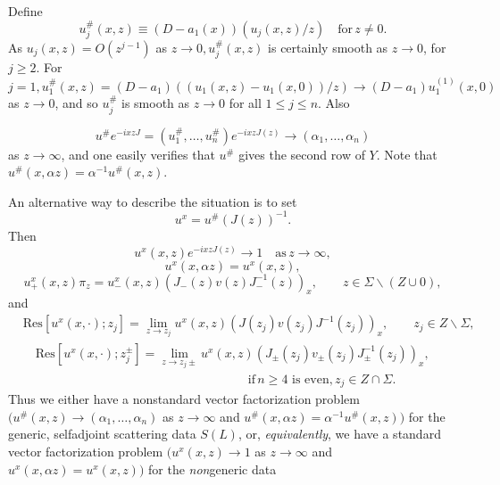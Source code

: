 \documentclass{surv-l}
\theoremstyle{plain}
\theoremstyle{definition}
\numberwithin{equation}{chapter}
\begin{document}
Define
\begin{equation}\label{eq38.12}
u_{j}^{\#}(x, z)\equiv(D-a_{1}(x))(u_{j}(x,z)/z) \quad \mathrm{for}\, z\neq 0.
\end{equation}
As $u_{j}(x, z)=O(z^{j-1})$ as $z\rightarrow 0, u_{j}^{\#}(x,z)$ is certainly smooth as $z\rightarrow 0$, for $j\geq 2$. For $j=1, u_{1}^{\#}(x, z)=(D-a_{1})((u_{1}(x, z)-u_{1}(x,0))/z)\rightarrow(D-a_{1})u_{1}^{(1)}(x, 0)$ as $z\rightarrow 0$, and so $u_{j}^{\#}$ is smooth as $z\rightarrow 0$ for all $1\leq j\leq n$. Also

\begin{equation*}
u^{\#}e^{-ixzJ}= (u_{1}^{\#},\ldots,u_{n}^{\#})e^{-ixzJ(z)}\rightarrow(\alpha_{1},\ldots,\alpha_{n})
\end{equation*}
as $ z\rightarrow\infty$, and one easily verifies that $ u^{\#}$ gives the second row of $Y$. Note that $u^{\#}(x,\alpha z)=\alpha^{-1} u^{\#}(x, z)$.

An alternative way to describe the situation is to set
\begin{equation}\label{eq38.13}
u^{x}=u^{\#}(J(z))^{-1}.
\end{equation}
Then
\begin{equation}\label{eq38.14}
u^{x}(x, z)e^{-ixzJ(z)}\rightarrow 1 \quad  \mathrm{as}\,z\rightarrow\infty,
\end{equation}
\begin{equation}\label{eq38.15}
u^{x}(x, \alpha z)=u^{x}(x, z),
\end{equation}
\begin{equation}\label{eq38.16}
u_{+}^{x}(x,z)\pi_{z}=u_{-}^{x}(x, z)(J_{-}(z)v(z)J_{-}^{-1}(z))_{x}, \qquad  z\in\Sigma\backslash (Z\cup 0),
\end{equation}
and
\begin{align}\label{eq38.17}
&\mathrm{Res}[u^{x}(x,\cdot);z_{j}]=\lim_{z\rightarrow z_{j}}u^{x}(x, z)(J(z_{j})v(z_{j})J^{-1}(z_{j}))_{x},\qquad  z_{j}\in Z\backslash \Sigma, \\
&\quad\mathrm{Res}[u^{x}(x,\cdot);z_{j}^{\pm}]=\lim_{z\rightarrow z_{j}\pm}u^{x}(x,z)(J_{\pm}(z_{j})v_{\pm}(z_{j})J_{\pm}^{-1}(z_{j}))_{x},\nonumber \\
& \qquad \qquad \qquad \qquad \qquad  \qquad \qquad \qquad \qquad\mathrm{if} \,n\geq 4 \text{ is even},  z_{j}\in Z\cap\Sigma.\nonumber
\end{align}
Thus we either have a nonstandard vector factorization problem $(u^{\#} (x,z)\rightarrow (\alpha_{1},\ldots,\alpha_{n})$ as $ z\rightarrow\infty$ and $u^{\#}(x,\alpha z)=\alpha^{-1}u^{\#}(x, z))$ for the generic, selfadjoint scattering data $S(L)$, or, \emph{equivalently}, we have a standard vector factorization problem $(u^{x}(x, z)\rightarrow 1$ as $ z\rightarrow\infty$ and $u^{x}(x, \alpha z)=u^{x}(x, z))$ for the \emph{non}generic data
\end{document}
